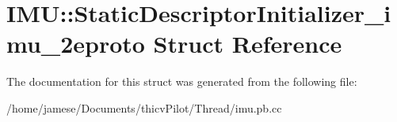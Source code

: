 \hypertarget{struct_i_m_u_1_1_static_descriptor_initializer__imu__2eproto}{}\section{I\+MU\+:\+:Static\+Descriptor\+Initializer\+\_\+imu\+\_\+2eproto Struct Reference}
\label{struct_i_m_u_1_1_static_descriptor_initializer__imu__2eproto}


The documentation for this struct was generated from the following file\+:\begin{DoxyCompactItemize}
\item 
/home/jamese/\+Documents/thicv\+Pilot/\+Thread/imu.\+pb.\+cc\end{DoxyCompactItemize}
